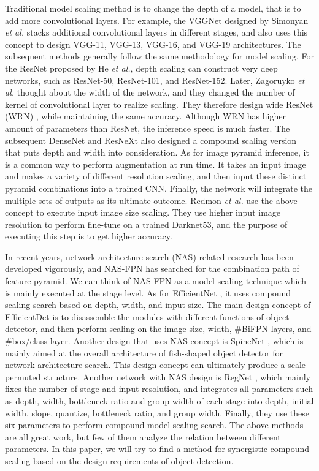 \documentclass[10pt,twocolumn,letterpaper]{article}
\begin{document}
Traditional model scaling method is to change the depth of a model, that is to add more convolutional layers. For example, the VGGNet \cite{simonyan2014very} designed by Simonyan \textit{et al.} stacks additional convolutional layers in different stages, and also uses this concept to design VGG-11, VGG-13, VGG-16, and VGG-19 architectures.  The subsequent methods generally follow the same methodology for model scaling.  For the ResNet \cite{he2016deep} proposed by He \textit{et al.}, depth scaling can construct very deep networks, such as ResNet-50, ResNet-101, and ResNet-152.  Later, Zagoruyko \textit{et al.} \cite{zagoruyko2016wide} thought about the width of the network, and they changed the number of kernel of convolutional layer to realize scaling. They therefore design wide ResNet (WRN) , while maintaining the same accuracy. Although WRN has higher amount of parameters than ResNet, the inference speed is much faster. The subsequent DenseNet \cite{huang2017densely} and ResNeXt \cite{xie2017aggregated} also designed a compound scaling version that puts depth and width into consideration. As for image pyramid inference, it is a common way to perform augmentation at run time.  It takes an input image and makes a variety of different resolution scaling, and then input these distinct pyramid combinations into a trained CNN.  Finally, the network will integrate the multiple sets of outputs as its ultimate outcome.  Redmon \textit{et al.} \cite{redmon2018yolov3} use the above concept to execute input image size scaling.  They use higher input image resolution to perform fine-tune on a trained Darknet53, and the purpose of executing this step is to get higher accuracy.   

In recent years, network architecture search (NAS) related research has been developed vigorously, and NAS-FPN \cite{ghiasi2019fpn} has searched for the combination path of feature pyramid.  We can think of NAS-FPN as a model scaling technique which is mainly executed at the stage level.  As for EfficientNet \cite{tan2019efficientnet}, it uses compound scaling search based on depth, width, and input size.  The main design concept of EfficientDet \cite{tan2019efficientdet} is to disassemble the modules with different functions of object detector, and then perform scaling on the image size, width, \#BiFPN layers, and \#box/class layer.  Another design that uses NAS concept is SpineNet \cite{du2019spinenet}, which is mainly aimed at the overall architecture of fish-shaped object detector for network architecture search.  This design concept can ultimately produce a scale-permuted structure.  Another network with NAS design is RegNet \cite{radosavovic2020designing}, which mainly fixes the number of stage and input resolution, and integrates all parameters such as depth, width, bottleneck ratio and group width of each stage into depth, initial width, slope, quantize, bottleneck ratio, and group width.  Finally, they use these six parameters to perform compound model scaling search.  The above methods are all great work, but few of them analyze the relation between different parameters.  In this paper, we will try to find a method for synergistic compound scaling based on the design requirements of object detection.
\end{document}
